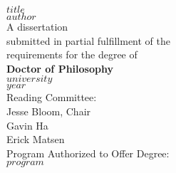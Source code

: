 \thispagestyle{empty}
\vspace*{\fill}
\begin{center}
\huge{$title$} \\
\vspace{1cm}
\Large{$author$} \\
\vspace{1cm}
A dissertation \\
submitted in partial fulfillment of the \\
requirements for the degree of \\
\vspace{1cm}
\textbf{Doctor of Philosophy} \\
\vspace{1cm}
$university$ \\
$year$ \\
\vspace{1cm}
Reading Committee: \\
Jesse Bloom, Chair \\
Gavin Ha \\
Erick Matsen \\
\vspace{1cm}
Program Authorized to Offer Degree: \\
$program$
\end{center}
\vspace*{\fill}
\newpage
